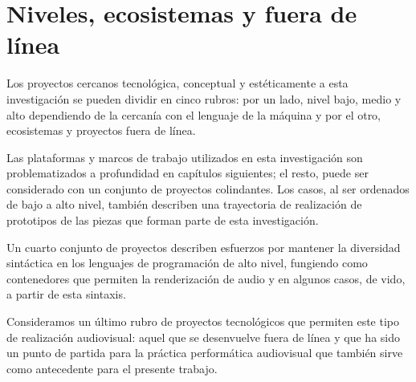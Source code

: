 


\section{Niveles, ecosistemas y fuera de línea}

Los proyectos cercanos tecnológica, conceptual y estéticamente a esta investigación se pueden dividir en cinco rubros: por un lado, nivel bajo, medio y alto dependiendo de la cercanía con el lenguaje de la máquina y por el otro, ecosistemas y proyectos fuera de línea.

Las plataformas y marcos de trabajo utilizados en esta investigación son problematizados a profundidad en capítulos siguientes; el resto, puede ser considerado con un conjunto de proyectos colindantes. Los casos, al ser ordenados de bajo a alto nivel, también describen una trayectoria de realización de prototipos de las piezas que forman parte de esta investigación.

Un cuarto conjunto de proyectos describen esfuerzos por mantener la diversidad sintáctica en los lenguajes de programación de alto nivel, fungiendo como contenedores que permiten la renderización de audio y en algunos casos, de vido, a partir de esta sintaxis.

Consideramos un último rubro de proyectos tecnológicos que permiten este tipo de realización audiovisual: aquel que se desenvuelve fuera de línea y que ha sido un punto de partida para la práctica performática audiovisual que también sirve como antecedente para el presente trabajo. 

